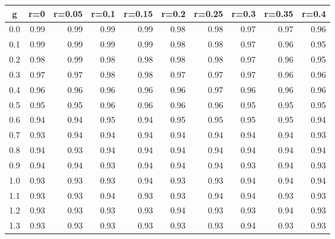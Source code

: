 %
\begin{table}[!tbp]
 \begin{center}
 \begin{tabular}{rrrrrrrrrr}\hline\hline
\multicolumn{1}{c}{g}&\multicolumn{1}{c}{r=0}&\multicolumn{1}{c}{r=0.05}&\multicolumn{1}{c}{r=0.1}&\multicolumn{1}{c}{r=0.15}&\multicolumn{1}{c}{r=0.2}&\multicolumn{1}{c}{r=0.25}&\multicolumn{1}{c}{r=0.3}&\multicolumn{1}{c}{r=0.35}&\multicolumn{1}{c}{r=0.4}\tabularnewline
\hline
0.0&0.99&0.99&0.99&0.99&0.98&0.98&0.97&0.97&0.96\tabularnewline
0.1&0.99&0.99&0.99&0.99&0.98&0.98&0.97&0.96&0.95\tabularnewline
0.2&0.98&0.99&0.98&0.98&0.98&0.98&0.97&0.96&0.95\tabularnewline
0.3&0.97&0.97&0.98&0.98&0.97&0.97&0.97&0.96&0.96\tabularnewline
0.4&0.96&0.96&0.96&0.96&0.96&0.97&0.96&0.96&0.96\tabularnewline
0.5&0.95&0.95&0.96&0.96&0.96&0.96&0.95&0.95&0.95\tabularnewline
0.6&0.94&0.94&0.95&0.94&0.95&0.95&0.95&0.95&0.94\tabularnewline
0.7&0.93&0.94&0.94&0.94&0.94&0.94&0.94&0.94&0.93\tabularnewline
0.8&0.94&0.93&0.94&0.94&0.94&0.94&0.94&0.94&0.94\tabularnewline
0.9&0.94&0.94&0.93&0.94&0.94&0.94&0.93&0.94&0.93\tabularnewline
1.0&0.93&0.93&0.93&0.94&0.93&0.93&0.94&0.94&0.94\tabularnewline
1.1&0.93&0.93&0.94&0.93&0.93&0.94&0.94&0.93&0.93\tabularnewline
1.2&0.93&0.93&0.93&0.93&0.94&0.93&0.93&0.94&0.93\tabularnewline
1.3&0.93&0.93&0.93&0.93&0.93&0.93&0.94&0.93&0.93\tabularnewline
\hline
\end{tabular}

\end{center}

\end{table}

